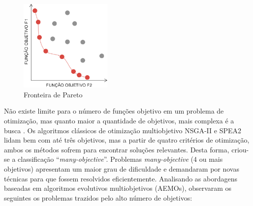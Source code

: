\begin{figure}
	\centering
	\includegraphics[width=0.4\textwidth]{cap_otimizacao-multi/figs/pareto}
	\caption{\label{fig_pareto}Fronteira de Pareto}
\end{figure}

Não existe limite para o número de funções objetivo em um problema de otimização, mas quanto maior a quantidade de objetivos, mais complexa é a busca \cite{Deb2014}. Os algoritmos clássicos de otimização multiobjetivo \ac{NSGA-II} e \ac{SPEA2} lidam bem com até três objetivos, mas a partir de quatro critérios de otimização, ambos os métodos sofrem para encontrar soluções relevantes. Desta forma, criou-se a classificação ``\textit{many-objective}''. Problemas \textit{many-objective} (4 ou mais objetivos) apresentam um maior grau de dificuldade e demandaram por novas técnicas para que fossem resolvidos eficientemente. Analisando as abordagens baseadas em algoritmos evolutivos multiobjetivos (AEMOs), \cite{Deb2014} observaram os seguintes os problemas trazidos pelo alto número de objetivos:

